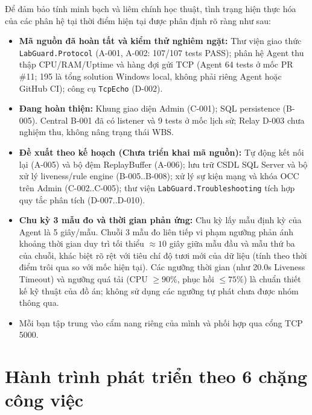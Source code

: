 \documentclass[12pt,a4paper]{article}
\begin{document}
Để đảm bảo tính minh bạch và liêm chính học thuật, tình trạng hiện thực hóa của các phân hệ tại thời điểm hiện tại được phân định rõ ràng như sau:
\begin{itemize}
  \item \textbf{Mã nguồn đã hoàn tất và kiểm thử nghiêm ngặt:} Thư viện giao thức \texttt{LabGuard.Protocol} (A-001, A-002: 107/107 tests PASS); phân hệ Agent thu thập CPU/RAM/Uptime và hàng đợi gửi TCP (Agent 64 tests ở mốc PR \#11; 195 là tổng solution Windows local, không phải riêng Agent hoặc GitHub CI); công cụ \texttt{TcpEcho} (D-002).
  \item \textbf{Đang hoàn thiện:} Khung giao diện Admin (C-001); SQL persistence (B-005). Central B-001 đã có listener và 9 tests ở mốc lịch sử; Relay D-003 chưa nghiệm thu, không nâng trạng thái WBS.
  \item \textbf{Đề xuất theo kế hoạch (Chưa triển khai mã nguồn):} Tự động kết nối lại (A-005) và bộ đệm ReplayBuffer (A-006); lưu trữ CSDL SQL Server và bộ xử lý liveness/rule engine (B-005..B-008); xử lý sự kiện mạng và khóa OCC trên Admin (C-002..C-005); thư viện \texttt{LabGuard.Troubleshooting} tích hợp quy tắc phân tích (D-007..D-010).
  \item \textbf{Chu kỳ 3 mẫu đo và thời gian phản ứng:} Chu kỳ lấy mẫu định kỳ của Agent là 5 giây/mẫu. Chuỗi 3 mẫu đo liên tiếp vi phạm ngưỡng phản ánh khoảng thời gian duy trì tối thiểu $\approx 10$ giây giữa mẫu đầu và mẫu thứ ba của chuỗi, khác biệt rõ rệt với tiêu chí độ tươi mới của dữ liệu (tính theo thời điểm trôi qua so với mốc hiện tại). Các ngưỡng thời gian (như 20.0s Liveness Timeout) và ngưỡng quá tải (CPU $\ge 90\%$, phục hồi $\le 75\%$) là chuẩn thiết kế kỹ thuật của đồ án; không sử dụng các ngưỡng tự phát chưa được nhóm thông qua.
\end{itemize}

\begin{takeawaybox}
\begin{itemize}[leftmargin=1.5em, itemsep=1pt]
  \item Mỗi bạn tập trung vào cẩm nang riêng của mình và phối hợp qua cổng TCP 5000.
\end{itemize}
\end{takeawaybox}

\section{Hành trình phát triển theo 6 chặng công việc}
\end{document}
